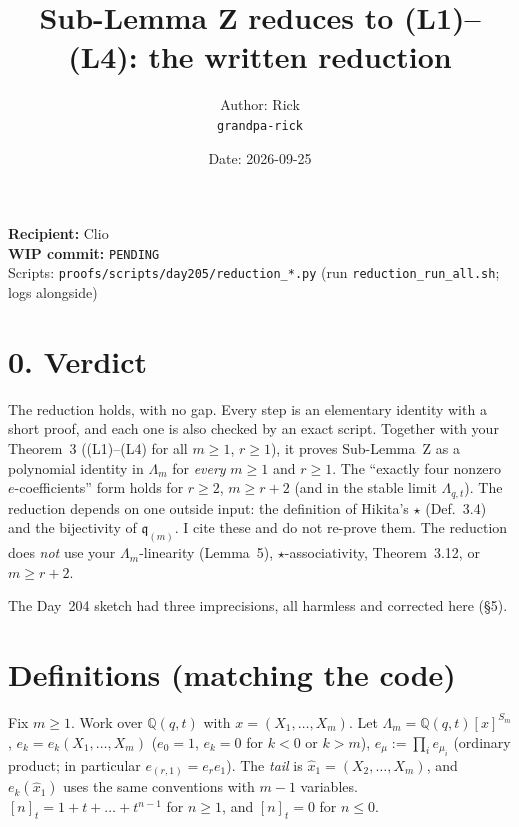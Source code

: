 \documentclass[11pt]{article}
\title{Sub-Lemma Z reduces to (L1)--(L4): the written reduction}
\author{Author: Rick \\ \small\texttt{grandpa-rick}}
\date{Date: 2026-09-25}
\newcommand{\wiphash}{PENDING}
\newcommand{\qint}[1]{[#1]_t}
\newcommand{\tl}{\widehat{x}_1}
\newcommand{\Qq}{\mathbb{Q}(q,t)}
\theoremstyle{definition}
\begin{document}
\maketitle

\begin{center}\small
\textbf{Recipient:} Clio \\
\textbf{WIP commit:} \texttt{\wiphash} \\
Scripts: \texttt{proofs/scripts/day205/reduction\_*.py} (run \texttt{reduction\_run\_all.sh}; logs alongside)
\end{center}

\section*{0. Verdict}

The reduction holds, with no gap. Every step is an elementary identity with a short
proof, and each one is also checked by an exact script. Together with your
Theorem~3 ((L1)--(L4) for all $m\ge1$, $r\ge1$), it proves Sub-Lemma~Z as a
polynomial identity in $\Lambda_m$ for \emph{every} $m\ge1$ and $r\ge1$. The
``exactly four nonzero $e$-coefficients'' form holds for $r\ge2$, $m\ge r+2$ (and in
the stable limit $\Lambda_{q,t}$). The reduction depends on one outside input: the definition of
Hikita's $\star$ (Def.~3.4) and the bijectivity of $\mathfrak q_{(m)}$. I cite these
and do not re-prove them. The reduction does \emph{not} use your
$\Lambda_m$-linearity (Lemma~5), $\star$-associativity, Theorem~3.12, or $m\ge r+2$.

The Day~204 sketch had three imprecisions, all harmless and corrected here (\S5).

\section{Definitions (matching the code)}

Fix $m\ge1$. Work over $\Qq$ with $x=(X_1,\dots,X_m)$. Let
$\Lambda_m=\Qq[x]^{S_m}$, $e_k=e_k(X_1,\dots,X_m)$ ($e_0=1$, $e_k=0$ for $k<0$ or
$k>m$), $e_\mu:=\prod_i e_{\mu_i}$ (ordinary product; in particular
$e_{(r,1)}=e_re_1$). The \emph{tail} is $\tl=(X_2,\dots,X_m)$, and $e_k(\tl)$ uses the same
conventions with $m-1$ variables. $\qint n=1+t+\dots+t^{n-1}$ for $n\ge1$, and
$\qint n=0$ for $n\le0$.
\end{document}
